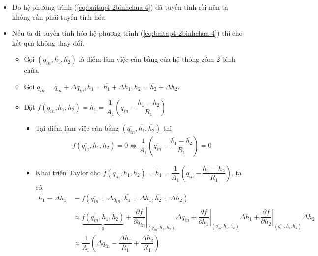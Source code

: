\begin{enumerate}[\it a.]
\begin{itemize}
                \item Do hệ phương trình (\ref{eq:baitap4-2binhchua-4}) đã tuyến tính rồi nên ta không cần phải tuyến tính hóa.

                \item Nếu ta đi tuyến tính hóa hệ phương trình (\ref{eq:baitap4-2binhchua-4}) thì cho kết quả không thay đổi.
                    \begin{itemize}
                        \item Gọi $\left({\overline{q_{in}}, \overline{h_1}, \overline{h_2}}\right)$ là điểm làm việc cân bằng của hệ thống gồm 2 bình chứa.

                        \item Gọi $q_{in} = \overline{q_{in}} + \Delta q_{in}, h_1 = \overline{h_1} + \Delta h_1, h_2 = \overline{h_2} + \Delta h_2$.

                        \item Đặt $f\left({q_{in}, h_1, h_2}\right) = \dot{h_1} = \dfrac{1}{A_1} \left({q_{in} - \dfrac{h_1 - h_2}{R_1}}\right)$
                            \begin{itemize}
                                \item Tại điểm làm việc cân bằng $\left({\overline{q_{in}}, \overline{h_1}, \overline{h_2}}\right)$ thì
                                    \begin{align}
                                        f\left({\overline{q_{in}}, \overline{h_1}, \overline{h_2}}\right) = 0 \Longleftrightarrow \dfrac{1}{A_1} \left({\overline{q_{in}} - \dfrac{\overline{h_1} - \overline{h_2}}{R_1}}\right) = 0
                                    \end{align}

                                \item Khai triển Taylor cho $f\left({q_{in}, h_1, h_2}\right) = \dot{h_1} = \dfrac{1}{A_1} \left({q_{in} - \dfrac{h_1 - h_2}{R_1}}\right)$, ta có:
                                    \begin{align}
                                        \dot{h_1} = \Delta \dot{h_1} & = f\left({\overline{q_{in}} + \Delta q_{in}, \overline{h_1} + \Delta h_1, \overline{h_2} + \Delta h_2}\right) \\
                                        & \approx \underbrace{f\left({\overline{q_{in}}, \overline{h_1}, \overline{h_2}}\right)}_{0} + \left.\dfrac{\partial f}{\partial q_{in}}\right|_{\left({\overline{q_{in}}, \overline{h_1}, \overline{h_2}}\right)} \Delta q_{in} + \left.\dfrac{\partial f}{\partial h_1}\right|_{\left({\overline{q_{in}}, \overline{h_1}, \overline{h_2}}\right)} \Delta h_1 + \left.\dfrac{\partial f}{\partial h_2}\right|_{\left({\overline{q_{in}}, \overline{h_1}, \overline{h_2}}\right)} \Delta h_2\\
                                        & \approx \dfrac{1}{A_1} \left({\Delta q_{in} - \dfrac{\Delta h_1}{R_1} + \dfrac{\Delta h_2}{R_1}}\right)\\
                                    \end{align}


\end{itemize}
\end{itemize}
\end{itemize}
\end{enumerate}
